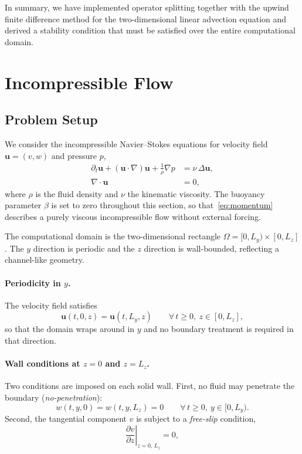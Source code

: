In summary, we have implemented operator splitting together with the
upwind finite difference method for the two-dimensional linear advection
equation and derived a stability condition that must be satisfied over the
entire computational domain.

\newpage


\section{Incompressible Flow}\label{Chorins}

\subsection{Problem Setup}

We consider the incompressible Navier--Stokes equations for velocity field $\mathbf{u} = (v,w)$ and pressure $p$,
\begin{align}
    \partial_t \mathbf{u} + (\mathbf{u} \cdot \nabla)\mathbf{u}
        + \frac{1}{\rho}\nabla p
        &= \nu \,\Delta \mathbf{u}, \label{eq:momentum} \\
    \nabla \cdot \mathbf{u} &= 0, \label{eq:incompressibility} 
\end{align}
where $\rho$ is the fluid density and $\nu$ the kinematic viscosity. The buoyancy parameter $\beta$ is set to zero throughout this section, so that~\eqref{eq:momentum} describes a purely viscous incompressible flow without external forcing.

The computational domain is the two-dimensional rectangle $\Omega = [0, L_y) \times [0, L_z]$. The $y$ direction is periodic and the $z$ direction is wall-bounded, reflecting a channel-like geometry.

\paragraph{Periodicity in $y$.}
The velocity field satisfies
\begin{equation}
    \mathbf{u}(t, 0, z) = \mathbf{u}(t, L_y, z)
    \qquad \forall\, t \geq 0,\ z \in [0, L_z],
\end{equation}
so that the domain wraps around in $y$ and no boundary treatment is required in that direction. 

\paragraph{Wall conditions at $z = 0$ and $z = L_z$.}
Two conditions are imposed on each solid wall. First, no fluid may penetrate the boundary (\textit{no-penetration}):
\begin{equation}
    w(t, y, 0) = w(t, y, L_z) = 0
    \qquad \forall\, t \geq 0,\ y \in [0, L_y).
    \label{eq:no-penetration}
\end{equation}
Second, the tangential component $v$ is subject to a \textit{free-slip} condition,
\begin{equation}
    \left.\frac{\partial v}{\partial z}\right|_{z=0,\,L_z} = 0,
    \label{eq:free-slip}
\end{equation}

